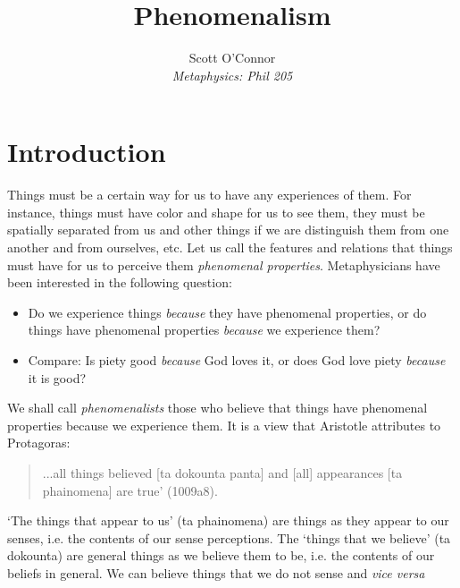 \documentclass[article,oneside]{memoir}
\def\myaffiliation{Metaphysics: Phil 205}
\def\myauthor{Scott O'Connor}
\def\mytitle{Phenomenalism}
\begin{document}
\setsansfont[Mapping=tex-text]{Myriad Pro}  
\setmonofont[Mapping=tex-text,Scale=MatchLowercase]{Minion Pro} 
\pagestyle{kjh}

\title{\mytitle}

\author{\myauthor \\
 \emph{\myaffiliation \\ }}


\maketitle

\section{Introduction}

Things must be a certain way for us to have any experiences of them. For instance, things must have color and shape for us to see them, they must be spatially separated from us and other things if we are distinguish them from one another and from ourselves, etc. Let us call the features and relations that things must have for us to perceive them \emph{phenomenal properties}. Metaphysicians have been interested in the following question: 
\begin{itemize}
\item Do we experience things  \emph{because} they have phenomenal properties, or do things have phenomenal properties \emph{because} we experience them?
\item Compare: Is piety good \emph{because} God loves it, or does God love piety \emph{because} it is good? 
\end{itemize} 
We shall call \emph{phenomenalists} those who believe that things have phenomenal properties because we experience them.  It is a view that Aristotle attributes to Protagoras: 
\begin{quote}
...all things believed [ta dokounta panta] and [all] appearances [ta phainomena] are true’ (1009a8).
\end{quote}
`The things that appear to us' (ta phainomena) are things as they appear to our senses, i.e. the contents of our sense perceptions. The `things that we believe’ (ta dokounta) are general things as we believe them to be, i.e. the contents of our beliefs in general. We can believe things that we do not sense and \emph{vice versa} 
\end{document}

